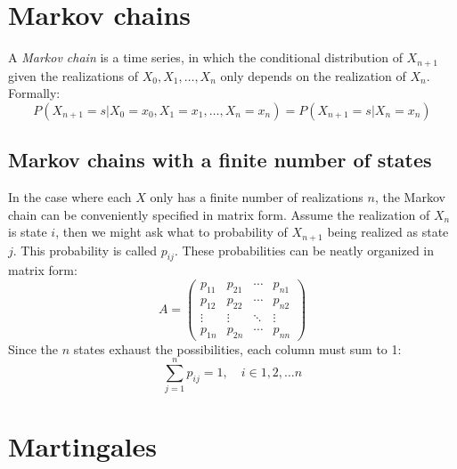 \documentclass[12pt, a4paper]{article}
\numberwithin{equation}{section}
\begin{document}
\section{Markov chains}
A \textit{Markov chain} is a time series, in which the conditional distribution of $X_{n+1}$ given the realizations of $X_0, X_1,\ldots, X_n$ only depends on the realization of $X_n$. Formally:
\begin{equation}
P(X_{n+1}=s|X_0=x_0, X_1=x_1,\ldots, X_n=x_n)=P(X_{n+1}=s|X_n=x_n)
\end{equation}


\subsection{Markov chains with a finite number of states}
In the case where each $X$ only has a finite number of realizations $n$, the Markov chain can be conveniently specified in matrix form. Assume the realization of $X_n$ is state $i$, then we might ask what to probability of $X_{n+1}$ being realized as state $j$. This probability is called $p_{ij}$. These probabilities can be neatly organized in matrix form:
\begin{equation}
A=\begin{pmatrix}
p_{11}	& p_{21}	& \cdots	& p_{n1} \\
p_{12}	& p_{22}	& \cdots	& p_{n2} \\
\vdots	& \vdots	& \ddots	& \vdots \\
p_{1n}	& p_{2n}	& \cdots	& p_{nn}
\end{pmatrix}
\end{equation}
Since the $n$ states exhaust the possibilities, each column must sum to 1:
\begin{equation}
\sum_{j=1}^n p_{ij}=1,\quad i\in{1,2,\ldots n}
\end{equation}

\section{Martingales}
\end{document}
